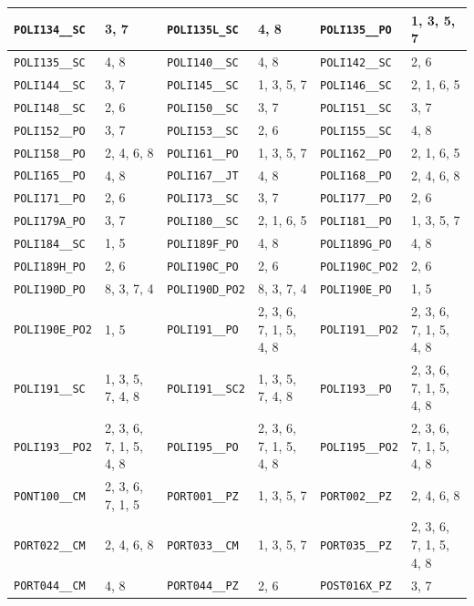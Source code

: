 \begin{longtable}{|l|l||l|l||l|l|}
    \verb|POLI134__SC| & 3, 7 & \verb|POLI135L_SC| & 4, 8 & \verb|POLI135__PO| & 1, 3, 5, 7\\\hline
    \verb|POLI135__SC| & 4, 8 & \verb|POLI140__SC| & 4, 8 & \verb|POLI142__SC| & 2, 6\\\hline
    \verb|POLI144__SC| & 3, 7 & \verb|POLI145__SC| & 1, 3, 5, 7 & \verb|POLI146__SC| & 2, 1, 6, 5\\\hline
    \verb|POLI148__SC| & 2, 6 & \verb|POLI150__SC| & 3, 7 & \verb|POLI151__SC| & 3, 7\\\hline
    \verb|POLI152__PO| & 3, 7 & \verb|POLI153__SC| & 2, 6 & \verb|POLI155__SC| & 4, 8\\\hline
    \verb|POLI158__PO| & 2, 4, 6, 8 & \verb|POLI161__PO| & 1, 3, 5, 7 & \verb|POLI162__PO| & 2, 1, 6, 5\\\hline
    \verb|POLI165__PO| & 4, 8 & \verb|POLI167__JT| & 4, 8 & \verb|POLI168__PO| & 2, 4, 6, 8\\\hline
    \verb|POLI171__PO| & 2, 6 & \verb|POLI173__SC| & 3, 7 & \verb|POLI177__PO| & 2, 6\\\hline
    \verb|POLI179A_PO| & 3, 7 & \verb|POLI180__SC| & 2, 1, 6, 5 & \verb|POLI181__PO| & 1, 3, 5, 7\\\hline
    \verb|POLI184__SC| & 1, 5 & \verb|POLI189F_PO| & 4, 8 & \verb|POLI189G_PO| & 4, 8\\\hline
    \verb|POLI189H_PO| & 2, 6 & \verb|POLI190C_PO| & 2, 6 & \verb|POLI190C_PO2| & 2, 6\\\hline
    \verb|POLI190D_PO| & 8, 3, 7, 4 & \verb|POLI190D_PO2| & 8, 3, 7, 4 & \verb|POLI190E_PO| & 1, 5\\\hline
    \verb|POLI190E_PO2| & 1, 5 & \verb|POLI191__PO| & 2, 3, 6, 7, 1, 5, 4, 8 & \verb|POLI191__PO2| & 2, 3, 6, 7, 1, 5, 4, 8\\\hline
    \verb|POLI191__SC| & 1, 3, 5, 7, 4, 8 & \verb|POLI191__SC2| & 1, 3, 5, 7, 4, 8 & \verb|POLI193__PO| & 2, 3, 6, 7, 1, 5, 4, 8\\\hline
    \verb|POLI193__PO2| & 2, 3, 6, 7, 1, 5, 4, 8 & \verb|POLI195__PO| & 2, 3, 6, 7, 1, 5, 4, 8 & \verb|POLI195__PO2| & 2, 3, 6, 7, 1, 5, 4, 8\\\hline
    \verb|PONT100__CM| & 2, 3, 6, 7, 1, 5 & \verb|PORT001__PZ| & 1, 3, 5, 7 & \verb|PORT002__PZ| & 2, 4, 6, 8\\\hline
    \verb|PORT022__CM| & 2, 4, 6, 8 & \verb|PORT033__CM| & 1, 3, 5, 7 & \verb|PORT035__PZ| & 2, 3, 6, 7, 1, 5, 4, 8\\\hline
    \verb|PORT044__CM| & 4, 8 & \verb|PORT044__PZ| & 2, 6 & \verb|POST016X_PZ| & 3, 7\\\hline

\end{longtable}
